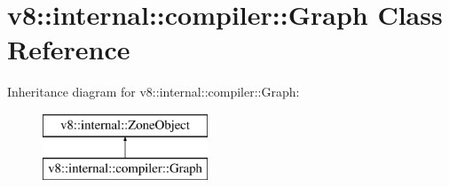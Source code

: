 \hypertarget{classv8_1_1internal_1_1compiler_1_1_graph}{}\section{v8\+:\+:internal\+:\+:compiler\+:\+:Graph Class Reference}
\label{classv8_1_1internal_1_1compiler_1_1_graph}
Inheritance diagram for v8\+:\+:internal\+:\+:compiler\+:\+:Graph\+:\begin{figure}[H]
\begin{center}
\leavevmode
\includegraphics[height=2.000000cm]{classv8_1_1internal_1_1compiler_1_1_graph}
\end{center}
\end{figure}
